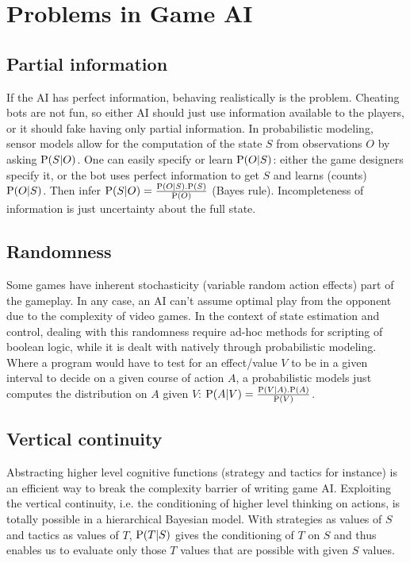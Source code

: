 \section{Problems in Game AI}

\subsection{Partial information}
If the AI has perfect information, behaving realistically is the problem. Cheating bots are not fun, so either AI should just use information available to the players, or it should fake having only partial information. In probabilistic modeling, sensor models allow for the computation of the state $S$ from observations $O$ by asking $\mathrm{P}(S|O)$. One can easily specify or learn $\mathrm{P}(O|S)$: either the game designers specify it, or the bot uses perfect information to get $S$ and learns (counts) $\mathrm{P}(O|S)$. Then infer $\mathrm{P}(S|O) = \frac{\mathrm{P}(O|S).\mathrm{P}(S)}{\mathrm{P}(O)}$ (Bayes rule). Incompleteness of information is just uncertainty about the full state.

\subsection{Randomness}
Some games have inherent stochasticity (variable random action effects) part of the gameplay. In any case, an AI can't assume optimal play from the opponent due to the complexity of video games. In the context of state estimation and control, dealing with this randomness require ad-hoc methods for scripting of boolean logic, while it is dealt with natively through probabilistic modeling. Where a program would have to test for an effect/value $V$ to be in a given interval to decide on a given course of action $A$, a probabilistic models just computes the distribution on $A$ given $V$: $\mathrm{P}(A|V) = \frac{\mathrm{P}(V|A).\mathrm{P}(A)}{\mathrm{P}(V)}$.

\subsection{Vertical continuity}
Abstracting higher level cognitive functions (strategy and tactics for instance) is an efficient way to break the complexity barrier of writing game AI. Exploiting the vertical continuity, i.e. the conditioning of higher level thinking on actions, is totally possible in a hierarchical Bayesian model. With strategies as values of $S$ and tactics as values of $T$, $\mathrm{P}(T|S)$ gives the conditioning of $T$ on $S$ and thus enables us to evaluate only those $T$ values that are possible with given $S$ values.


